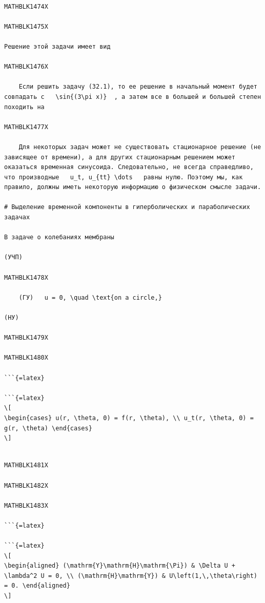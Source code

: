 \documentclass[
]{article}
\begin{document}
\begin{verbatim}

MATHBLK1474X

MATHBLK1475X

Решение этой задачи имеет вид

MATHBLK1476X

    Если решить задачу (32.1), то ее решение в начальный момент будет совпадать с   \sin{(3\pi x)}  , а затем все в большей и большей степен походить на

MATHBLK1477X

    Для некоторых задач может не существовать стационарное решение (не зависящее от времени), а для других стационарным решением может оказаться временная синусоида. Следовательно, не всегда справедливо, что производные   u_t, u_{tt} \dots   равны нулю. Поэтому мы, как правило, должны иметь некоторую информацию о физическом смысле задачи.

# Выделение временной компоненты в гиперболических и параболических задачах

В задаче о колебаниях мембраны

(УЧП)

MATHBLK1478X

    (ГУ)   u = 0, \quad \text{on a circle,} 

(НУ)

MATHBLK1479X

MATHBLK1480X

```{=latex}

```{=latex}
\[
\begin{cases} u(r, \theta, 0) = f(r, \theta), \\ u_t(r, \theta, 0) = g(r, \theta) \end{cases}
\]
\end{verbatim}

\begin{verbatim}

MATHBLK1481X

MATHBLK1482X

MATHBLK1483X

```{=latex}

```{=latex}
\[
\begin{aligned} (\mathrm{Y}\mathrm{H}\mathrm{\Pi}) & \Delta U + \lambda^2 U = 0, \\ (\mathrm{H}\mathrm{Y}) & U\left(1,\,\theta\right) = 0. \end{aligned}
\]
\end{verbatim}
\end{document}
